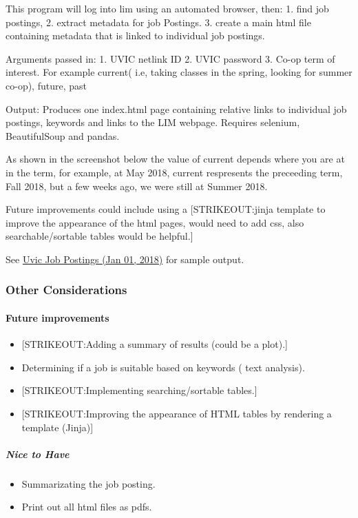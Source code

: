 This program will log into lim using an automated browser, then: 1. find
job postings, 2. extract metadata for job Postings. 3. create a main
html file containing metadata that is linked to individual job postings.

Arguments passed in: 1. UVIC netlink ID 2. UVIC password 3. Co-op term
of interest. For example current( i.e, taking classes in the spring,
looking for summer co-op), future, past

Output: Produces one index.html page containing relative links to
individual job postings, keywords and links to the LIM webpage. Requires
selenium, BeautifulSoup and pandas.

As shown in the screenshot below the value of current depends where you
are at in the term, for example, at May 2018, current respresents the
preceeding term, Fall 2018, but a few weeks ago, we were still at Summer
2018.

Future improvements could include using a {[}STRIKEOUT:jinja template to
improve the appearance of the html pages, would need to add css, also
searchable/sortable tables would be helpful.{]}

See \href{https://web.uvic.ca/~lidavid/jobScrapping/LIMScrap/}{Uvic Job
Postings (Jan 01, 2018)} for sample output.


\subsubsection{Other Considerations}\label{other-considerations}

\paragraph{Future improvements}\label{future-improvements}

\begin{itemize}
\tightlist
\item
  {[}STRIKEOUT:Adding a summary of results (could be a plot).{]}
\item
  Determining if a job is suitable based on keywords ( text analysis).
\item
  {[}STRIKEOUT:Implementing searching/sortable tables.{]}
\item
  {[}STRIKEOUT:Improving the appearance of HTML tables by rendering a
  template (Jinja){]}
\end{itemize}


\subparagraph{Nice to Have}\label{nice-to-have}

\begin{itemize}
\tightlist
\item
  Summarizating the job posting.
\item
  Print out all html files as pdfs.
\end{itemize}


